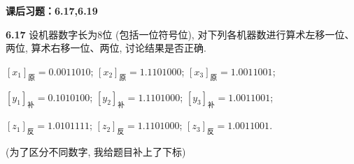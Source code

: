 \documentclass[UTF8]{report}
\newcommand{\problem}[1]{{\setlength{\parskip}{10pt}\noindent \bf{#1}}}
\begin{document}

\maketitle



\textbf{课后习题：6.17,6.19}

\problem{6.17} 设机器数字长为8位 (包括一位符号位), 对下列各机器数进行算术左移一位、两位, 算术右移一位、两位, 讨论结果是否正确.

$[x_1]_{\text{原}} = 0.001 1010$;  $[x_2]_{\text{原}} = 1.110 1000$;  $[x_3]_{\text{原}} = 1.001 1001$; 

$[y_1]_{\text{补}} = 0.101 0100$;  $[y_2]_{\text{补}} = 1.110 1000$;  $[y_3]_{\text{补}} = 1.001 1001$; 

$[z_1]_{\text{反}} = 1.010 1111$;  $[z_2]_{\text{反}} = 1.110 1000$;  $[z_3]_{\text{反}} = 1.001 1001$.

(为了区分不同数字, 我给题目补上了下标)
\end{document}
